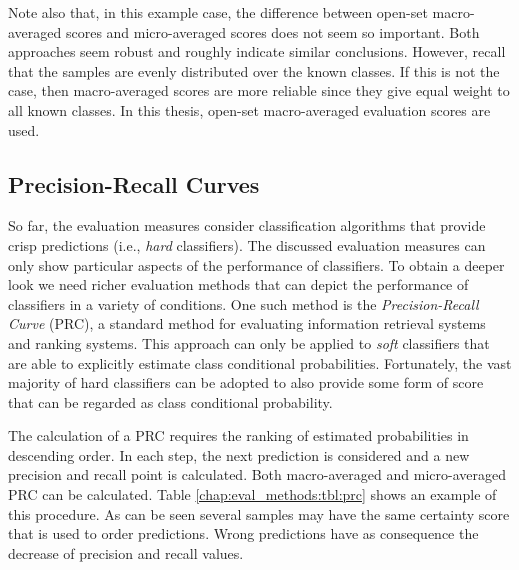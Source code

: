 Note also that, in this example case, the difference between open-set macro-averaged scores and micro-averaged scores does not seem so important. Both approaches seem robust and roughly indicate similar conclusions. However, recall that the samples are evenly distributed over the known classes. If this is not the case, then macro-averaged scores are more reliable since they give equal weight to all known classes. In this thesis, open-set macro-averaged evaluation scores are used.

\subsection{Precision-Recall Curves}\label{chap:eval_methods:sec:roc_prc}

So far, the evaluation measures consider classification algorithms that provide crisp predictions (i.e., \textit{hard} classifiers). The discussed evaluation measures can only show particular aspects of the performance of classifiers. To obtain a deeper look we need richer evaluation methods that can depict the performance of classifiers in a variety of conditions. One such method is the \textit{Precision-Recall Curve} (PRC), a standard method for evaluating information retrieval systems and ranking systems. This approach can only be applied to \textit{soft} classifiers that are able to explicitly estimate class conditional probabilities. Fortunately, the vast majority of hard classifiers can be adopted to also provide some form of score that can be regarded as class conditional probability.

The calculation of a PRC requires the ranking of estimated probabilities in descending order. In each step, the next prediction is considered and a new precision and recall point is calculated. Both macro-averaged and micro-averaged PRC can be calculated. Table \ref{chap:eval_methods:tbl:prc} shows an example of this procedure. As can be seen several samples may have the same certainty score that is used to order predictions. Wrong predictions have as consequence the decrease of precision and recall values.

